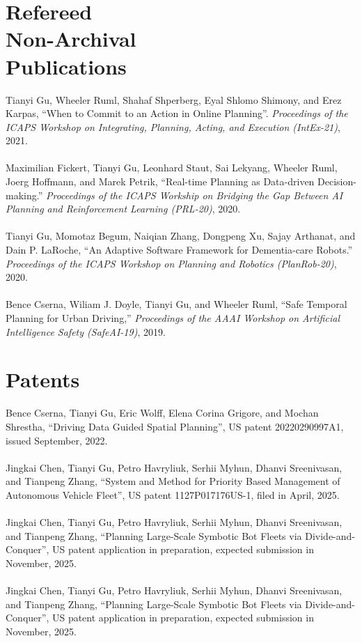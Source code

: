 \documentclass[margin, 10pt]{res} %
\begin{document}
\begin{resume}
\section{Refereed\\Non-Archival\\Publications}
Tianyi Gu, Wheeler Ruml, Shahaf Shperberg, Eyal Shlomo Shimony, and Erez Karpas, ``When to Commit to an Action in Online Planning''. {\sl Proceedings of the ICAPS Workshop on Integrating, Planning, Acting, and Execution (IntEx-21)}, 2021.\\~\\
Maximilian Fickert, Tianyi Gu, Leonhard Staut, Sai Lekyang, Wheeler Ruml, Joerg Hoffmann, and Marek Petrik, ``Real-time Planning as Data-driven Decision-making.'' {\sl Proceedings of the ICAPS Workship on Bridging the Gap Between AI Planning and Reinforcement Learning (PRL-20)}, 2020.\\~\\
Tianyi Gu, Momotaz Begum, Naiqian Zhang, Dongpeng Xu, Sajay Arthanat, and Dain P. LaRoche, ``An Adaptive Software Framework for Dementia-care Robots.'' {\sl Proceedings of the ICAPS Workshop on Planning and Robotics (PlanRob-20)}, 2020. \\~\\
Bence Cserna, Wiliam J. Doyle, Tianyi Gu, and Wheeler Ruml, ``Safe
Temporal Planning for Urban Driving,'' {\sl Proceedings of the AAAI
Workshop on Artificial Intelligence Safety (SafeAI-19)}, 2019.
\section{Patents}
Bence Cserna, Tianyi Gu, Eric Wolff, Elena Corina Grigore, and Mochan Shrestha, ``Driving Data Guided Spatial Planning'', US patent 20220290997A1, issued September, 2022.\\~\\
Jingkai Chen, Tianyi Gu, Petro Havryliuk, Serhii Myhun, 
Dhanvi Sreenivasan, and Tianpeng Zhang, ``System and Method for Priority Based Management of Autonomous Vehicle Fleet'', US patent 1127P017176US-1, filed in April, 2025. \\~\\ 
Jingkai Chen, Tianyi Gu, Petro Havryliuk, Serhii Myhun, 
Dhanvi Sreenivasan, and Tianpeng Zhang, ``Planning Large-Scale Symbotic Bot Fleets via Divide-and-Conquer'', US patent application in preparation, expected submission in November, 2025. \\~\\ 
Jingkai Chen, Tianyi Gu, Petro Havryliuk, Serhii Myhun, 
Dhanvi Sreenivasan, and Tianpeng Zhang, ``Planning Large-Scale Symbotic Bot Fleets via Divide-and-Conquer'', US patent application in preparation, expected submission in November, 2025. \\~\\ 


\end{resume}
\end{document}
